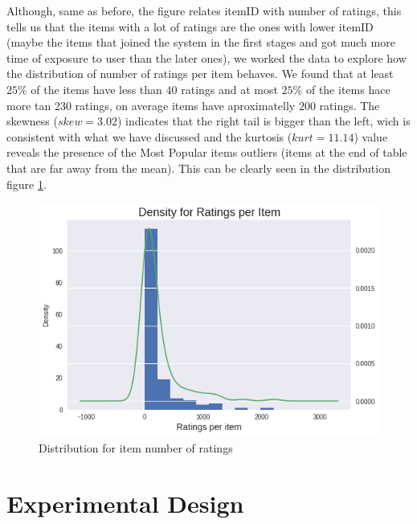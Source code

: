 \documentclass[letterpaper, 10 pt, conference]{ieeeconf}  %
\begin{document}
\begin{enumerate}
\begin{itemize}
        
        Although, same as before, the figure relates itemID with number of ratings, this tells us that the items with a lot of ratings are the ones with lower itemID (maybe the items that joined the system in the first stages and got much more time of exposure to user than the later ones), we worked the data to explore how the distribution of number of ratings per item behaves. We found that at least $25\%$ of the items have less than $40$ ratings and at most $25\%$ of the items hace more tan 230 ratings, on average items have aproximatelly $200$ ratings. The skewness ($skew=3.02$) indicates that the right tail is bigger than the left, wich is consistent with what we have discussed and the kurtosis ($kurt=11.14$) value reveals the presence of the Most Popular items outliers (items at the end of table that are far away from the mean). This can be clearly seen in the distribution figure \ref{fig:ratings-per-item-density}.
        
        \begin{figure}[h]
            \includegraphics[scale=0.4]{ratings-per-item-density.png}
            \centering
            \caption{Distribution for item number of ratings}
            \label{fig:ratings-per-item-density}
        \end{figure}
        
    \end{itemize}
    
\end{enumerate}

\section{Experimental Design}
\end{document}
